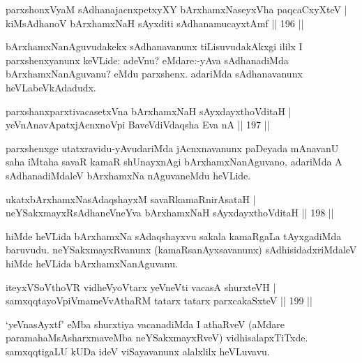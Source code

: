 \begin{shl}
parxshonxV\s yaM sAdhanajacnxpetxyXY bArxhamxNaseyxVha paqcaCxyXteV  |\\
kiMsAdhanoV bArxhamxNaH sAyxditi sAdhanamucayxtAmf \hfill || 196 ||
\end{shl}

\begin{artha}
bArxhamxNanAguvudakekx sAdhanavanunx tiLisuvudakAkxgi ililx I parxshenxyanunx keVLide: adeVnu? eMdare:-yAva sAdhanadiMda bArxhamxNanAguvanu? eMdu parxshenx. adariMda sAdhanavanunx heVLabeVkAdadudx.
\end{artha}

\begin{shl}
parxshanxparxtivacasetxVna bArxhamxNaH sAyxdayxthoVditaH |\\
yeVnAnavApatxjAcnxnoV\s pi BaveVdiVdaqsha Eva nA \hfill || 197 ||
\end{shl}

\begin{artha}
parxshenxge utatxravidu-yAvudariMda jAcnxnavanunx paDeyada mAnavanU saha iMtaha savaR kamaR shUnayxnAgi bArxhamxNanAguvano, adariMda A sAdhanadiMdaleV bArxhamxNa nAguvaneMdu heVLide.
\end{artha}

\begin{shl}
ukatxbArxhamxNasAdaqshayxM savaRkamaRnirAsataH |\\
neYSakxmayxRsAdhaneVneYva bArxhamxNaH sAyxdayxthoVditaH \hfill || 198 ||
\end{shl}

\begin{artha}
hiMde heVLida bArxhamxNa sAdaqshayxvu sakala kamaRgaLa tAyxgadiMda baruvudu. neYSakxmayxRvanunx (kamaRsanAyxsavanunx) sAdhisidadxriMdaleV hiMde heVLida bArxhamxNanAguvanu.
\end{artha}

\begin{shl}
iteyxVSoV\s thoVR vidheVyoV\s tarx yeVneVti vacasA shurxteVH |\\
samxqqtayoV\s piVmameVvAthaRM tatarx tatarx parxcakaSxteV \hfill || 199 ||
\end{shl}

\begin{artha}
`yeVnasAyxtf' eMba shurxtiya vacanadiMda I athaRveV (aMdare parama\-haMsAsharxmaveMba neYSakxmayxRveV) vidhisalapxTiTxde. samxqqtigaLU kUDa ideV viSayavanunx alalxlilx heVLuvavu.
\end{artha}%


